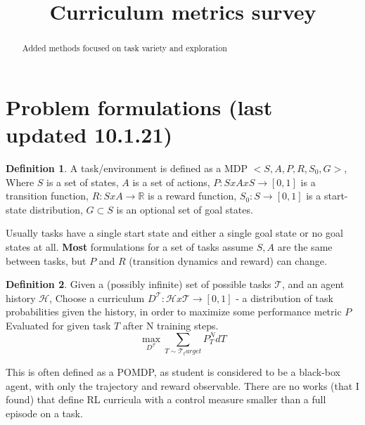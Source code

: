 \documentclass[letterpaper]{article}
\title{Curriculum metrics survey}
\theoremstyle{definition}
\newtheorem{defn}{Definition}[section]
\begin{document}
	\maketitle
	\begin{abstract}
		Added methods focused on task variety and exploration
	\end{abstract}

\tableofcontents

\section{Problem formulations (last updated 10.1.21)} \label{sec:formulation}
\begin{defn}
	A task/environment is defined as a MDP $<S,A,P,R,S_0,G>$,
	Where $S$ is a set of states, $A$ is a set of actions, $P:SxAxS\rightarrow [0,1]$ is a transition function, 
	$R:SxA\rightarrow \mathbb{R}$ is a reward function, $S_0:S\rightarrow [0,1]$ is a start-state distribution,
	$G\subset S$ is an optional set of goal states.
\end{defn}

Usually tasks have a single start state and either a single goal state or no goal states at all.
\textbf{Most} formulations for a set of tasks assume $S,A$ are the same between tasks, but $P$ and $R$ (transition dynamics and reward) can change.

\begin{defn} \label{defn:curriculum}
	Given a (possibly infinite) set of possible tasks $\mathcal{T}$, and an agent history $\mathcal{H}$, 
	Choose a curriculum $D^{\mathcal{T}}: \mathcal{H}x\mathcal{T}\rightarrow [0,1]$ - a distribution of task probabilities given the history,
	in order to maximize some performance metric $P$ Evaluated for given task $T$ after N training steps.
	\[
	\max_{D^{\mathcal{T}}} \sum_{T \sim \mathcal{T}_target} {P_T^N dT}
	\]

\end{defn}
This is often defined as a POMDP, as student is considered to be a black-box agent, with only the trajectory and reward observable.
There are no works (that I found) that define RL curricula with a control measure smaller than a full episode on a task.
\end{document}
